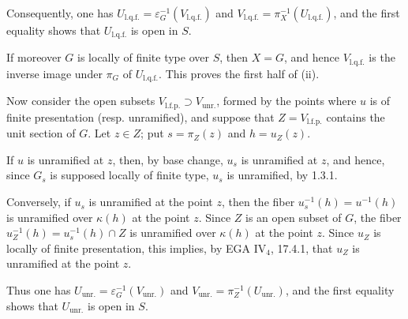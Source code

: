 Consequently, one has $U_{\mathrm{l.q.f.}}=\varepsilon_G^{-1}(V_{\mathrm{l.q.f.}})$ and $V_{\mathrm{l.q.f.}}=\pi_X^{-1}(U_{\mathrm{l.q.f.}})$, and the first equality shows that $U_{\mathrm{l.q.f.}}$ is open in $S$.

If moreover $G$ is locally of finite type over $S$, then $X=G$, and hence $V_{\mathrm{l.q.f.}}$ is the inverse image under $\pi_G$ of $U_{\mathrm{l.q.f.}}$. This proves the first half of (ii).

Now consider the open subsets $V_{\mathrm{l.f.p.}}\supset V_{\mathrm{unr.}}$, formed by the points where $u$ is of finite presentation (resp. unramified), and suppose that $Z=V_{\mathrm{l.f.p.}}$ contains the unit section of $G$. Let $z\in Z$; put $s=\pi_Z(z)$ and $h=u_Z(z)$.

If $u$ is unramified at $z$, then, by base change, $u_s$ is unramified at $z$, and hence, since $G_s$ is supposed locally of finite type, $u_s$ is unramified, by 1.3.1.

Conversely, if $u_s$ is unramified at the point $z$, then the fiber $u_s^{-1}(h)=u^{-1}(h)$ is unramified over $\kappa(h)$ at the point $z$. Since $Z$ is an open subset of $G$, the fiber $u_Z^{-1}(h)=u_s^{-1}(h)\cap Z$ is unramified over $\kappa(h)$ at the point $z$. Since $u_Z$ is locally of finite presentation, this implies, by EGA IV$_4$, 17.4.1, that $u_Z$ is unramified at the point $z$.

Thus one has $U_{\mathrm{unr.}}=\varepsilon_G^{-1}(V_{\mathrm{unr.}})$ and $V_{\mathrm{unr.}}=\pi_Z^{-1}(U_{\mathrm{unr.}})$, and the first equality shows that $U_{\mathrm{unr.}}$ is open in $S$.

